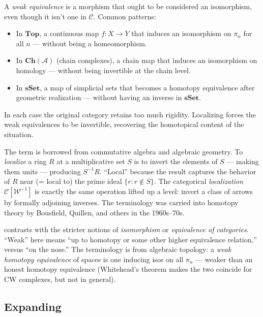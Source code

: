 A \emph{weak equivalence} is a morphism that ought to be considered an
isomorphism, even though it isn't one in $\mathcal{C}$. Common patterns:
\begin{itemize}
  \item In $\mathbf{Top}$, a continuous map $f : X \to Y$ that induces
        an isomorphism on $\pi_n$ for all $n$ — without being a
        homeomorphism.
  \item In $\mathbf{Ch}(\mathcal{A})$ (chain complexes), a chain map
        that induces an isomorphism on homology — without being
        invertible at the chain level.
  \item In $\mathbf{sSet}$, a map of simplicial sets that becomes a
        homotopy equivalence after geometric realization — without
        having an inverse in $\mathbf{sSet}$.
\end{itemize}
In each case the original category retains too much rigidity. Localizing
forces the weak equivalences to be invertible, recovering the homotopical
content of the situation.

\begin{nameorigin}
The term  is borrowed from commutative algebra and
algebraic geometry. To \emph{localize} a ring $R$ at a multiplicative
set $S$ is to invert the elements of $S$ — making them units — producing
$S^{-1} R$. ``Local'' because the result captures the behavior of $R$
near (= local to) the prime ideal $\{r : r \notin S\}$. The categorical
\emph{localization} $\mathcal{C}[\mathcal{W}^{-1}]$ is exactly the same
operation lifted up a level: invert a class of arrows by formally
adjoining inverses. The terminology was carried into homotopy theory
by Bousfield, Quillen, and others in the 1960s--70s.
\end{nameorigin}

\begin{nameorigin}
 contrasts with the stricter notions of
\emph{isomorphism} or \emph{equivalence of categories}. ``Weak'' here
means ``up to homotopy or some other higher equivalence relation,''
versus ``on the nose.'' The terminology is from algebraic topology:
a \emph{weak homotopy equivalence} of spaces is one inducing isos on
all $\pi_n$ — weaker than an honest homotopy equivalence (Whitehead's
theorem makes the two coincide for CW complexes, but not in general).
\end{nameorigin}

\subsection{Expanding}

